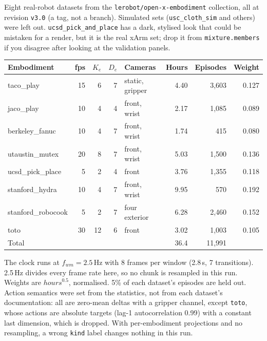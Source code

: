 \documentclass[10pt]{article}
\newcommand{\code}[1]{\texttt{\small #1}}
\begin{document}
Eight real-robot datasets from the \code{lerobot/open-x-embodiment} collection, all at
revision \code{v3.0} (a tag, not a branch). Simulated sets (\code{usc\_cloth\_sim} and others)
were left out. \code{ucsd\_pick\_and\_place} has a dark, stylised look that could be
mistaken for a render, but it is the real xArm set; drop it from
\code{mixture.members} if you disagree after looking at the validation panels.

\begin{center}\small
\begin{tabular}{@{}lrrrlrrr@{}}
\toprule
Embodiment & fps & $K_e$ & $D_e$ & Cameras & Hours & Episodes & Weight \\
\midrule
taco\_play & 15 & 6 & 7 & static, gripper & 4.40 & 3{,}603 & 0.127 \\
jaco\_play & 10 & 4 & 4 & front, wrist & 2.17 & 1{,}085 & 0.089 \\
berkeley\_fanuc & 10 & 4 & 7 & front, wrist & 1.74 & 415 & 0.080 \\
utaustin\_mutex & 20 & 8 & 7 & front, wrist & 5.03 & 1{,}500 & 0.136 \\
ucsd\_pick\_place & 5 & 2 & 4 & front & 3.76 & 1{,}355 & 0.118 \\
stanford\_hydra & 10 & 4 & 7 & front, wrist & 9.95 & 570 & 0.192 \\
stanford\_robocook & 5 & 2 & 7 & four exterior & 6.28 & 2{,}460 & 0.152 \\
toto & 30 & 12 & 6 & front & 3.02 & 1{,}003 & 0.105 \\
\midrule
Total & & & & & 36.4 & 11{,}991 & \\
\bottomrule
\end{tabular}
\end{center}

The clock runs at $f_{wm}=2.5$\,Hz with 8 frames per window (2.8\,s, 7 transitions). 2.5\,Hz
divides every frame rate here, so no chunk is resampled in this run. Weights are
$\mathit{hours}^{0.5}$, normalised. 5\% of each dataset's episodes are held out.
Action semantics were set from the statistics, not from each dataset's documentation: all
are zero-mean deltas with a gripper channel, except \code{toto}, whose actions are absolute
targets (lag-1 autocorrelation 0.99) with a constant last dimension, which is dropped. With
per-embodiment projections and no resampling, a wrong \code{kind} label changes nothing in
this run.
\end{document}
